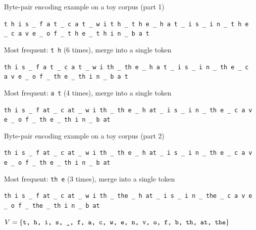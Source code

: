 \documentclass[12pt,aspectratio=169,handout]{beamer}
\begin{document}
\begin{frame}{Byte-pair encoding example on a toy corpus (part 1)}

\small{
\texttt{t h i s \_ f a t \_ c a t \_ w i t h \_ t h e \_ h a t \_ i s \_ i n \_ t h e \_ c a v e  \_ o f \_ t h e \_ t h i n \_ b a t}
}

Most frequent: \texttt{t h} (6 times), merge into a single token

\small{
\texttt{th i s \_ f a t \_ c a t \_ w i th \_ th e \_ h a t \_ i s \_ i n \_ th e \_ c a v e  \_ o f \_ th e \_ th i n \_ b a t}
}

Most frequent: \texttt{a t} (4 times), merge into a single token

\small{
\texttt{th i s \_ f at \_ c at \_ w i th \_ th e \_ h at \_ i s \_ i n \_ th e \_ c a v e  \_ o f \_ th e \_ th i n \_ b at}
}


\end{frame}

\begin{frame}{Byte-pair encoding example on a toy corpus (part 2)}

\small{	
\texttt{th i s \_ f at \_ c at \_ w i th \_ th e \_ h at \_ i s \_ i n \_ th e \_ c a v e  \_ o f \_ th e \_ th i n \_ b at}
}

Most frequent: \texttt{th e} (3 times), merge into a single token

\small{
\texttt{th i s \_ f at \_ c at \_ w i th \_ the \_ h at \_ i s \_ i n \_ the \_ c a v e  \_ o f \_ the \_ th i n \_ b at}
}

\small{
$V = \{
\text{\texttt{t, h, i, s, \_, f, a, c, w, e, n, v, o, f, b, th, at, the}}
\}$
}



\end{frame}
\end{document}
